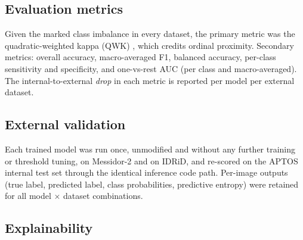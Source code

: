 \documentclass[journal]{IEEEtran}
\renewcommand{\_}{\origunderscore\allowbreak}
\begin{document}
\subsection{Evaluation metrics}
\label{sec:methods-metrics}

Given the marked class imbalance in every dataset, the primary metric was the
quadratic-weighted kappa (QWK) \cite{cohen1968kappa}, which credits ordinal
proximity. Secondary metrics: overall accuracy, macro-averaged F1, balanced
accuracy, per-class sensitivity and specificity, and one-vs-rest AUC (per class
and macro-averaged). The internal-to-external \emph{drop} in each metric is
reported per model per external dataset.

\subsection{External validation}
\label{sec:methods-ext}

Each trained model was run once, unmodified and without any further training or
threshold tuning, on Messidor-2 and on IDRiD, and re-scored on the APTOS internal
test set through the identical inference code path. Per-image outputs (true label,
predicted label, class probabilities, predictive entropy) were retained for all
model $\times$ dataset combinations.

\subsection{Explainability}
\label{sec:methods-explain}
\end{document}
